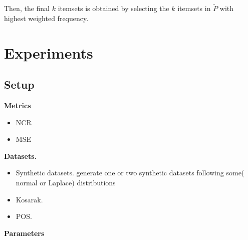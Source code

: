 \documentclass[conference]{IEEEtran}
\begin{document}

Then, the final $k$ itemsets is obtained by selecting the $k$ itemsets in $\tilde{P}$ with highest weighted frequency.




\section{Experiments}
\subsection{Setup}
\textbf{Metrics}
\begin{itemize}
\item NCR
\item MSE
\end{itemize}

\textbf{Datasets.}
\begin{itemize}
\item Synthetic datasets. {\color{red} generate one or two synthetic datasets following some( normal or Laplace) distributions}
\item Kosarak.
\item POS.
\end{itemize}

\textbf{Parameters}
\end{document}
